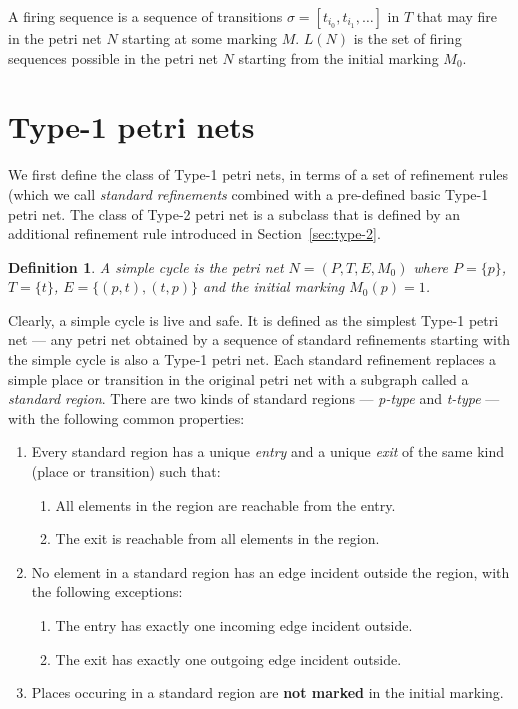 \documentclass[12pt,a4paper]{article}
\newtheorem{definition}{Definition}
\begin{document}
A firing sequence is a sequence of transitions $\sigma = [t_{i_0},
t_{i_1}, \ldots]$ in $T$ that may fire in the petri net $N$ starting
at some marking $M$. $L(N)$ is the set of firing sequences possible in
the petri net $N$ starting from the initial marking $M_0$.

\section{Type-1 petri nets}
\label{sec:type-1}

We first define the class of Type-1 petri nets, in terms of a set of
refinement rules (which we call \emph{standard refinements} combined
with a pre-defined basic Type-1 petri net. The class of Type-2 petri
net is a subclass that is defined by an additional refinement rule
introduced in Section~\ref{sec:type-2}.

\begin{definition}
  A \emph{simple cycle} is the petri net $N = (P, T, E, M_0)$ where $P
  = \{p\}$, $T =\{t\}$, $E = \{(p,t), (t,p)\}$ and the
  initial marking $M_0(p) = 1$.
\end{definition}

Clearly, a simple cycle is live and safe. It is defined as the
simplest Type-1 petri net --- any petri net obtained by a sequence of
standard refinements starting with the simple cycle is also a Type-1
petri net. Each standard refinement replaces a simple place or
transition in the original petri net with a subgraph called a
\emph{standard region}. There are two kinds of standard regions ---
\emph{p-type} and \emph{t-type} --- with the following common
properties:

  \begin{enumerate}
  \item Every standard region has a unique \emph{entry} and a unique
    \emph{exit} of the same kind (place or transition) such that:
    \begin{enumerate}
    \item All elements in the region are reachable from the entry.
    \item The exit is reachable from all elements in the region.
    \end{enumerate}
  \item No element in a standard region has an edge incident outside
    the region, with the following exceptions:
    \begin{enumerate}
    \item The entry has exactly one incoming edge incident outside.
    \item The exit has exactly one outgoing edge incident outside.
    \end{enumerate}
  \item Places occuring in a standard region are \textbf{not
      marked} in the initial marking.
\end{enumerate}
\end{document}
